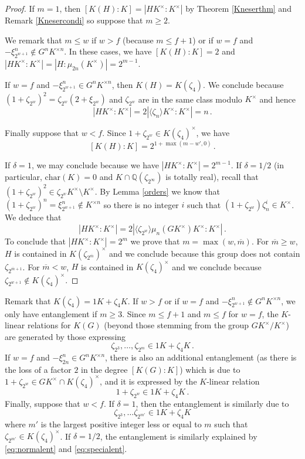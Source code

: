 \documentclass[11pt, a4paper]{amsart}
\theoremstyle{definition}
\newcommand{\Q}{\mathbb{Q}}
\newcommand{\ch}{\mathrm{char}}
\renewcommand{\geq}{\geqslant}
\renewcommand{\leq}{\leqslant}
\begin{document}
\begin{proof}
If $m=1$, then  $[K(H):K]=|HK^\times:K^\times|$ by Theorem \ref{Kneserthm} and Remark \ref{Knesercondi} so suppose that $m\geq 2$.

We remark that $m\leq w$ if $w>f$ (because  $m\leq f+1$) or if $w=f$ and $-\xi_{2^{w+1}}^n\notin G^nK^{\times n}$. In these cases, we have $[K(H):K]=2$ and $|HK^\times:K^\times|=|H:\mu_{2n}(K^\times)|=2^{m-1}$.

If $w=f$ and $-\xi_{2^{w+1}}^n\in G^nK^{\times n}$, then $K(H)=K(\zeta_4)$.
We conclude because $(1+\zeta_{2^w})^2=\zeta_{2^w}(2+\xi_{2^w})$ and $\zeta_{2^w}$ are in the same class modulo $K^\times$ and hence   
$$|HK^\times: K^\times|=2|\langle \zeta_n\rangle K^\times: K^\times|=n\,.$$

Finally suppose that $w<f$. 
Since $1+\zeta_{2^w}\in K(\zeta_4)^\times$, we have 
$$[K(H):K]=2^{1+\max(m-w',0)}\,.$$

If $\delta=1$, we may conclude because we have $|HK^\times:K^\times|=2^{m-1}$.
If $\delta=1/2$ (in particular, $\ch(K)=0$ and $K\cap \Q(\zeta_{{2^\infty}})$ is  totally real), recall that $(1+\zeta_{2^w})^2\in \zeta_{2^w} K^\times\setminus K^\times $. By Lemma \ref{orders} we know that $(1+\zeta_{2^w})^n=\xi_{2^{w+1}}^{n}\notin K^{\times n}$ so there is no integer $i$ such that 
$(1+\zeta_{2^w})\zeta_{n}^i\in K^\times$.
We deduce that 
$$|HK^\times: K^\times|=2 |\langle \zeta_{2^w}\rangle \mu_n(GK^\times)K^\times: K^\times|\,.$$
To conclude that $|HK^\times: K^\times|=2^m$
we prove that $m=\max(w,\overline{m})$. 
For $\overline{m}\geq w$, $H$ is contained in $K(\zeta_{2^{\overline{m}}})^\times$ and we conclude because this group does not contain $\zeta_{2^{\overline{m}+1}}$. %
For $\overline{m}<w$, $H$ is contained in $K(\zeta_{4})^\times$ and we conclude because $\zeta_{2^{w+1}}\notin K(\zeta_{4})^\times$.
\end{proof}

Remark that $K(\zeta_4)=1K+\zeta_4 K$. If $w>f$ or if $w=f$ and $-\xi_{2^{w+1}}^n\notin G^n K^{\times n}$, we only have entanglement if $m\geq 3$. Since $m \leq f+1$ and $m\leq f$ for $w=f$, the $K$-linear relations for $K(G)$ (beyond those stemming from the group $GK^\times/K^\times$) are generated by those expressing 
$$\zeta_{2^3},\ldots, \zeta_{2^m}\in 1 K+\zeta_4K\,.$$
If $w=f$ and $-\xi_{2n}^n\in G^n K^{\times n}$, there is also an additional entanglement (as there is the loss of a factor $2$ in the degree $[K(G):K]$) which is due to $1+\zeta_{2^w}\in GK^\times \cap K(\zeta_4)^\times$, and it is expressed by the $K$-linear relation
\begin{equation}\label{eq:specialent}
1+\zeta_{2^w}\in 1 K+ \zeta_4 K\,.    
\end{equation}
Finally, suppose that $w<f$. If $\delta=1$, then the entanglement is similarly due to
\begin{equation}\label{eq:normalent}
\zeta_{2^3},\ldots \zeta_{2^{m'}}\in 1K +\zeta_4 K
\end{equation}
where $m'$ is the largest positive integer less or equal to $m$ such that $\zeta_{2^{m'}}\in K(\zeta_4)^\times$.
If $\delta=1/2$, the  entanglement is similarly explained by \eqref{eq:normalent} and \eqref{eq:specialent}.
\end{document}
